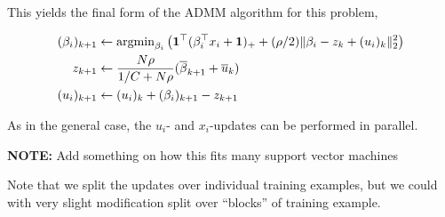 \documentclass[11pt]{article}
\begin{document}
This yields the final form of the ADMM algorithm for this problem,

\begin{equation*}
\begin{aligned}
    (\beta_i)_{k+1} 
    & \leftarrow \operatorname{argmin}_{\beta_i} \left(\mathbf{1}^\top(\beta_i^\top x_i + \mathbf{1})_+ + (\rho/2) \|\beta_i - z_k + (u_i)_k \|_2^2 \right) \\
    z_{k+1} 
    & \leftarrow \frac{N\rho}{1/C + N\rho} (\overline{\beta}_{k+1} + \overline{u}_k) \\
    (u_i)_{k+1} 
     & \leftarrow (u_i)_k + (\beta_i)_{k+1} - z_{k+1}
\end{aligned}
\end{equation*}


As in the general case, the $u_i$- and $x_i$-updates can be performed in parallel.


\textbf{NOTE:} Add something on how this fits many support vector machines

Note that we split the updates over individual training examples, but we could with very slight 
modification split over ``blocks'' of training example. 



\end{document}
